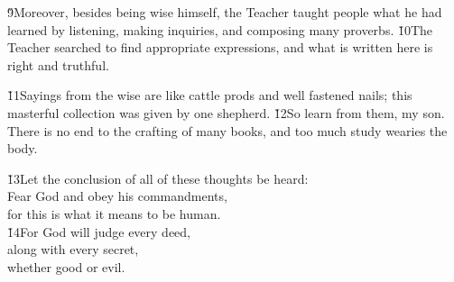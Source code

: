 \v{9}Moreover, besides being wise himself, the Teacher taught people what he had learned by listening, making inquiries, and composing many proverbs. \v{10}The Teacher searched to find appropriate expressions, and what is written here is right and truthful.

\v{11}Sayings from the wise are like cattle prods and well fastened nails; this masterful collection was given by one shepherd. \v{12}So learn from them, my son. There is no end to the crafting of many books, and too much study wearies the body.

\begin{poetry}
\poeml \v{13}Let the conclusion of all of these thoughts be heard: \\
\poeml Fear God and obey his commandments, \\
\poemll    for this is what it means to be human. \\
\poeml \v{14}For God will judge every deed, \\
\poemll    along with every secret, \\
\poemlll       whether good or evil.\end{poetry}
